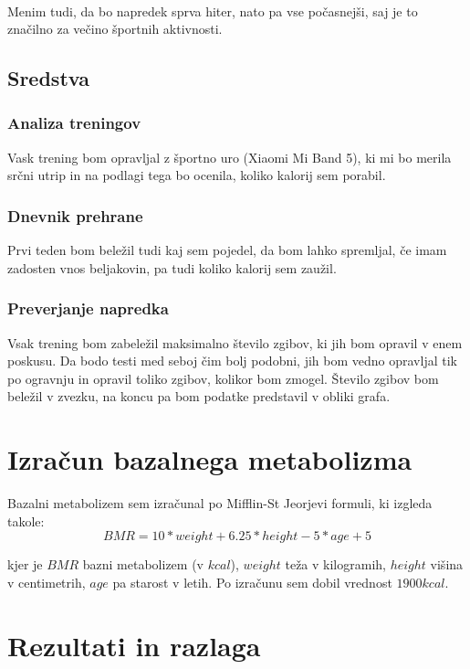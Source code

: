 \documentclass{article}
\begin{document}
\paragraph{}
Menim tudi, da bo napredek sprva hiter, nato pa vse počasnejši, saj je to značilno za večino športnih aktivnosti.

\subsection{Sredstva}

\subsubsection{Analiza treningov}
Vask trening bom opravljal z športno uro (Xiaomi Mi Band 5), ki mi bo merila srčni utrip in na podlagi tega bo ocenila, koliko kalorij sem porabil.

\subsubsection{Dnevnik prehrane}
Prvi teden bom beležil tudi kaj sem pojedel, da bom lahko spremljal, če imam zadosten vnos beljakovin, pa tudi koliko kalorij sem zaužil.

\subsubsection{Preverjanje napredka}
Vsak trening bom zabeležil maksimalno število zgibov, ki jih bom opravil v enem poskusu. Da bodo testi med seboj čim bolj podobni, jih bom vedno opravljal tik po ogravnju in opravil toliko zgibov, kolikor bom zmogel. Število zgibov bom beležil v zvezku, na koncu pa bom podatke predstavil v obliki grafa.

\section{Izračun bazalnega metabolizma}
Bazalni metabolizem sem izračunal po Mifflin-St Jeorjevi formuli, ki izgleda takole:
\[
BMR = 10 * weight + 6.25 * height - 5 * age + 5 
\]

kjer je $BMR$ bazni metabolizem (v $kcal$), $weight$ teža v kilogramih, $height$ višina v centimetrih, $age$ pa starost v letih. Po izračunu sem dobil vrednost $1900 kcal$.

\section{Rezultati in razlaga}
\end{document}
